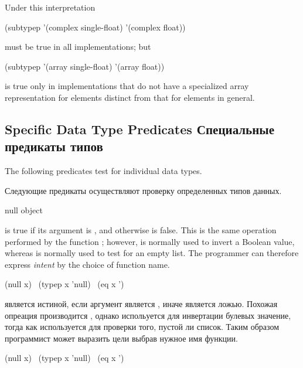 \begin{defun}[Function]
\begin{new}
Under this interpretation
\begin{lisp}
(subtypep '(complex single-float) '(complex float))
\end{lisp}
must be true in all implementations; but
\begin{lisp}
(subtypep '(array single-float) '(array float))
\end{lisp}
is true only in implementations that do not have a specialized array representation
for  elements distinct from that for  elements in
general.
\end{new}
\end{defun}

\subsection{Specific Data Type Predicates Специальные предикаты типов}

The following predicates test for individual data types.

Следующие предикаты осуществляют проверку определенных типов данных.

\begin{defun}[Function]
null object

 is true if its argument is {\emptylist},
and otherwise is false.
This is the same operation performed by the function ;
however,  is normally used to invert a Boolean value,
whereas  is normally used to test for an empty list.  The programmer
can therefore express \emph{intent} by the choice of function name.
\begin{lisp}
(null x) \EQ\ (typep x 'null) \EQ\ (eq x '{\emptylist})
\end{lisp}

 является истиной, если аргумент является {\emptylist}, иначе является
ложью. Похожая опреация производится , однако  испольуется для
инвертации булевых значение, тогда как  используется для проверки
того, пустой ли список. Таким образом программист может выразить цели выбрав
нужное имя функции.
\begin{lisp}
(null x) \EQ\ (typep x 'null) \EQ\ (eq x '{\emptylist})
\end{lisp}
\end{defun}

